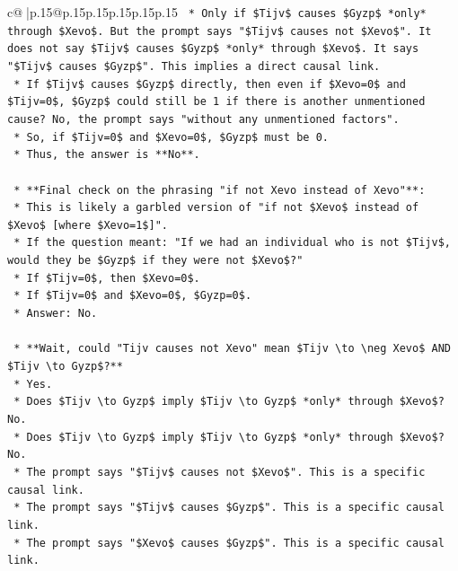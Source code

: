 \documentclass{article}
\begin{document}
{\begin{supertabular}{c@{$\;$}|p{.15\linewidth}@{}p{.15\linewidth}p{.15\linewidth}p{.15\linewidth}p{.15\linewidth}p{.15\linewidth}}
{{{\texttt{        *   Only if \$Tijv\$ causes \$Gyzp\$ *only* through \$Xevo\$. But the prompt says "\$Tijv\$ causes not \$Xevo\$". It does not say \$Tijv\$ causes \$Gyzp\$ *only* through \$Xevo\$. It says "\$Tijv\$ causes \$Gyzp\$". This implies a direct causal link.} \\
\texttt{        *   If \$Tijv\$ causes \$Gyzp\$ directly, then even if \$Xevo=0\$ and \$Tijv=0\$, \$Gyzp\$ could still be 1 if there is another unmentioned cause? No, the prompt says "without any unmentioned factors".} \\
\texttt{        *   So, if \$Tijv=0\$ and \$Xevo=0\$, \$Gyzp\$ must be 0.} \\
\texttt{        *   Thus, the answer is **No**.} \\
\\ 
\texttt{    *   **Final check on the phrasing "if not Xevo instead of Xevo"**:} \\
\texttt{        *   This is likely a garbled version of "if not \$Xevo\$ instead of \$Xevo\$ {[}where \$Xevo=1\${]}".} \\
\texttt{        *   If the question meant: "If we had an individual who is not \$Tijv\$, would they be \$Gyzp\$ if they were not \$Xevo\$?"} \\
\texttt{        *   If \$Tijv=0\$, then \$Xevo=0\$.} \\
\texttt{        *   If \$Tijv=0\$ and \$Xevo=0\$, \$Gyzp=0\$.} \\
\texttt{        *   Answer: No.} \\
\\ 
\texttt{    *   **Wait, could "Tijv causes not Xevo" mean \$Tijv \textbackslash{}to \textbackslash{}neg Xevo\$ AND \$Tijv \textbackslash{}to Gyzp\$?**} \\
\texttt{        *   Yes.} \\
\texttt{        *   Does \$Tijv \textbackslash{}to Gyzp\$ imply \$Tijv \textbackslash{}to Gyzp\$ *only* through \$Xevo\$? No.} \\
\texttt{        *   Does \$Tijv \textbackslash{}to Gyzp\$ imply \$Tijv \textbackslash{}to Gyzp\$ *only* through \$Xevo\$? No.} \\
\texttt{        *   The prompt says "\$Tijv\$ causes not \$Xevo\$". This is a specific causal link.} \\
\texttt{        *   The prompt says "\$Tijv\$ causes \$Gyzp\$". This is a specific causal link.} \\
\texttt{        *   The prompt says "\$Xevo\$ causes \$Gyzp\$". This is a specific causal link.} \\
}}}
\end{supertabular}}
\end{document}
